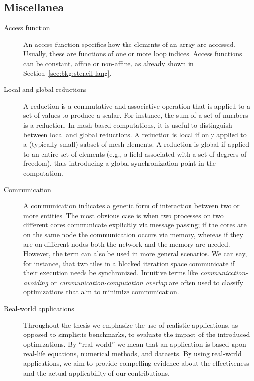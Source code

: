 \subsection*{Miscellanea}
\begin{description}

\item[Access function] An access function specifies how the elements of an array are accessed. Usually, these are functions of one or more loop indices. Access functions can be constant, affine or non-affine, as already shown in Section~\ref{sec:bkg:stencil-lang}.

\item[Local and global reductions] A reduction is a commutative and associative operation that is applied to a set of values to produce a scalar. For instance, the sum of a set of numbers is a reduction. In mesh-based computations, it is useful to distinguish between local and global reductions. A reduction is local if only applied to a (typically small) subset of mesh elements. A reduction is global if applied to an entire set of elements (e.g., a field associated with a set of degrees of freedom), thus introducing a global synchronization point in the computation. 

\item[Communication] A communication indicates a generic form of interaction between two or more entities. The most obvious case is when two processes on two different cores communicate explicitly via message passing; if the cores are on the same node the communication occurs via memory, whereas if they are on different nodes both the network and the memory are needed. However, the term can also be used in more general scenarios. We can say, for instance, that two tiles in a blocked iteration space communicate if their execution needs be synchronized. Intuitive terms like {\em communication-avoiding} or {\em communication-computation overlap} are often used to classify optimizations that aim to minimize communication.

\item[Real-world applications] Throughout the thesis we emphasize the use of realistic applications, as opposed to simplistic benchmarks, to evaluate the impact of the introduced optimizations. By ``real-world'' we mean that an application is based upon real-life equations, numerical methods, and datasets. By using real-world applications, we aim to provide compelling evidence about the effectiveness and the actual applicability of our contributions.
\end{description}


